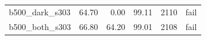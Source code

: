 \begin{table}[htbp]
\begin{tabular}{lrrrrr}
b500\_\allowbreak{}dark\_\allowbreak{}s303 & %
64.70 & %
0.00 & %
99.11 & %
2110 & %
fail \\ %

b500\_\allowbreak{}both\_\allowbreak{}s303 & %
66.80 & %
64.20 & %
99.01 & %
2108 & %
fail \\ %


\end{tabular}
\end{table}
